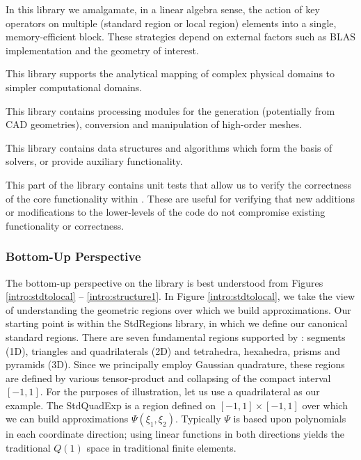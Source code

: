  In this library we amalgamate, in a linear algebra sense, the action of key operators on multiple 
(standard region or local region) elements into a single, memory-efficient block. These strategies depend on external
factors such as BLAS implementation and the geometry of interest. 

 This library supports the analytical mapping of complex physical domains to simpler computational domains.

 This library contains processing modules for the generation (potentially from CAD geometries), conversion and manipulation of high-order meshes.

 This library contains data structures and algorithms which form the basis of solvers, or provide auxiliary functionality.

 This part of the library contains unit tests that allow us to verify the correctness of the core functionality within {\nek}.  These are useful for verifying
that new additions or modifications to the lower-levels of the code do not compromise existing functionality or correctness.

\subsubsection{Bottom-Up Perspective}

The bottom-up perspective on the library is best understood from Figures \ref{intro:stdtolocal} -- \ref{intro:structure1}.  In Figure \ref{intro:stdtolocal}, we
take the view of understanding the geometric regions over which we build approximations.  Our starting point is within the StdRegions library, in which
we define our canonical standard regions.  There are seven fundamental regions supported by \nek{}:  segments (1D), triangles and quadrilaterals (2D) and tetrahedra, hexahedra,
prisms and pyramids (3D).  Since we principally employ Gaussian quadrature, these regions are defined by various tensor-product and collapsing of the
compact interval $[-1,1]$.  For the purposes of illustration, let us use a quadrilateral as our example.  The StdQuadExp is a region defined on $[-1,1] \times [-1,1]$
over which we can build approximations $\Psi(\xi_1,\xi_2)$.  Typically $\Psi$ is based upon polynomials in each coordinate direction; using linear functions
in both directions yields the traditional $Q(1)$ space in traditional finite elements.   

